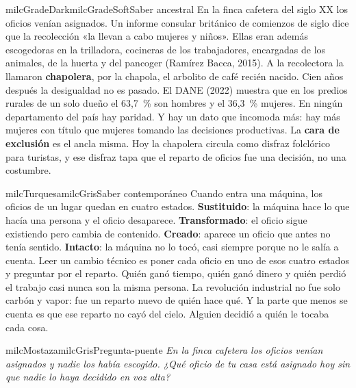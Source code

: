\documentclass[11pt,letterpaper]{article}
\begin{document}
\begin{softbox}{milcGradeDark}{milcGradeSoft}{Saber ancestral}
En la finca cafetera del siglo XX los oficios venían asignados. Un informe consular británico de comienzos de siglo dice que la recolección «la llevan a cabo mujeres y niños». Ellas eran además escogedoras en la trilladora, cocineras de los trabajadores, encargadas de los animales, de la huerta y del pancoger (Ramírez Bacca, 2015). A la recolectora la llamaron \textbf{chapolera}, por la chapola, el arbolito de café recién nacido. Cien años después la desigualdad no es pasado. El DANE (2022) muestra que en los predios rurales de un solo dueño el 63,7~\% son hombres y el 36,3~\% mujeres. En ningún departamento del país hay paridad. Y hay un dato que incomoda más: hay más mujeres con título que mujeres tomando las decisiones productivas. La \textbf{cara de exclusión} es el ancla misma. Hoy la chapolera circula como disfraz folclórico para turistas, y ese disfraz tapa que el reparto de oficios fue una decisión, no una costumbre.\par{}
\end{softbox}

\begin{softbox}{milcTurquesa}{milcGris}{Saber contemporáneo}
Cuando entra una máquina, los oficios de un lugar quedan en cuatro estados. \textbf{Sustituido}: la máquina hace lo que hacía una persona y el oficio desaparece. \textbf{Transformado}: el oficio sigue existiendo pero cambia de contenido. \textbf{Creado}: aparece un oficio que antes no tenía sentido. \textbf{Intacto}: la máquina no lo tocó, casi siempre porque no le salía a cuenta. Leer un cambio técnico es poner cada oficio en uno de esos cuatro estados y preguntar por el reparto. Quién ganó tiempo, quién ganó dinero y quién perdió el trabajo casi nunca son la misma persona. La revolución industrial no fue solo carbón y vapor: fue un reparto nuevo de quién hace qué. Y la parte que menos se cuenta es que ese reparto no cayó del cielo. Alguien decidió a quién le tocaba cada cosa.
\end{softbox}

\begin{softbox}{milcMostaza}{milcGris}{Pregunta-puente}
\textit{En la finca cafetera los oficios venían asignados y nadie los había escogido. ¿Qué oficio de tu casa está asignado hoy sin que nadie lo haya decidido en voz alta?}
\end{softbox}
\end{document}

